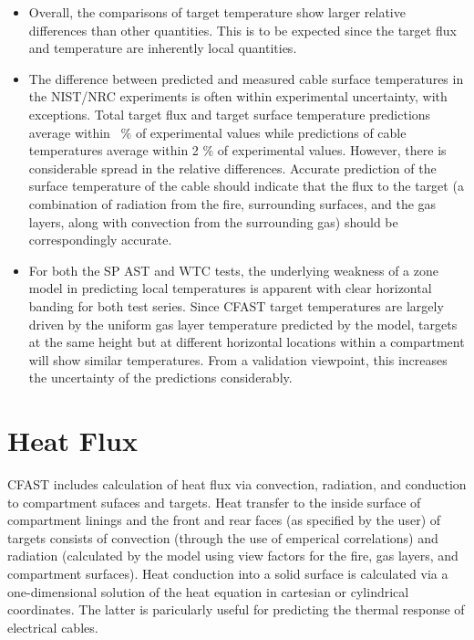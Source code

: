 \begin{itemize}
\item Overall, the comparisons of target temperature show larger relative differences than other quantities. This is to be expected since the target flux and temperature are inherently local quantities.
\item The difference between predicted and measured cable surface temperatures in the NIST/NRC experiments is often within experimental uncertainty, with exceptions.  Total target flux and target surface temperature predictions average within \Targfluxavg ~\% of experimental values while predictions of cable temperatures average within 2 \% of experimental values.  However, there is considerable spread in the relative differences.  Accurate prediction of the surface temperature of the cable should indicate that the flux to the target (a combination of radiation from the fire, surrounding surfaces, and the gas layers, along with convection from the surrounding gas) should be correspondingly accurate.  
\item For both the SP AST and WTC tests, the underlying weakness of a zone model in predicting local temperatures is apparent with clear horizontal banding for both test series.  Since CFAST target temperatures are largely driven by the uniform gas layer temperature predicted by the model, targets at the same height but at different horizontal locations within a compartment will show similar temperatures.  From a validation viewpoint, this increases the uncertainty of the predictions considerably.
\end{itemize}

\chapter{Heat Flux}

CFAST includes calculation of heat flux via convection, radiation, and conduction to compartment sufaces and targets. Heat transfer to the inside surface of compartment linings and the front and rear faces (as specified by the user) of targets consists of convection (through the use of emperical correlations) and radiation (calculated by the model using view factors for the fire, gas layers, and compartment surfaces). Heat conduction into a solid surface is calculated via a one-dimensional solution of the heat equation in cartesian or cylindrical coordinates.  The latter is paricularly useful for predicting the thermal response of electrical cables.


